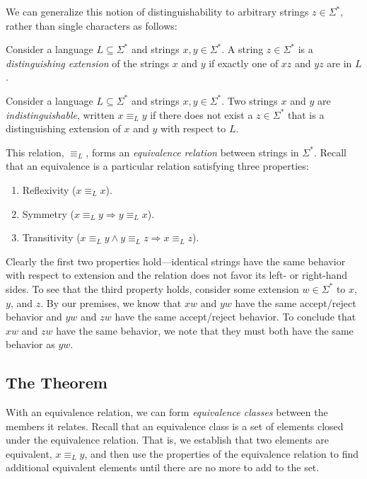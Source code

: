 \documentclass[11pt]{book}
\begin{document}
We can generalize this notion of distinguishability to arbitrary strings $z \in \Sigma^*$, rather than single characters as follows:
\begin{defn}
  Consider a language $L \subseteq \Sigma^*$ and strings $x, y \in \Sigma^*$.
  A string $z \in \Sigma^*$ is a \emph{distinguishing extension} of the strings $x$ and $y$ if exactly one of $xz$ and $yz$ are in $L$.
\end{defn}
\begin{defn}
  Consider a language $L \subseteq \Sigma^*$ and strings $x, y \in \Sigma^*$.
  Two strings $x$ and $y$ are \emph{indistinguishable}, written $x \equiv_L y$ if there does not exist a $z \in \Sigma^*$ that is a distinguishing extension of $x$ and $y$ with respect to $L$.
\end{defn}

This relation, $\equiv_L$, forms an \emph{equivalence relation} between strings in $\Sigma^*$.
Recall that an equivalence is a particular relation satisfying three properties:
\begin{enumerate}[itemsep=0pt]
  \item Reflexivity ($x \equiv_L x$).
  \item Symmetry ($x \equiv_L y \Rightarrow y \equiv_L x$).
  \item Transitivity ($x \equiv_L y \wedge y \equiv_L z \Rightarrow x \equiv_L z$).
\end{enumerate}
Clearly the first two properties hold---identical strings have the same behavior with respect to extension and the relation does not favor its left- or right-hand sides.
To see that the third property holds, consider some extension $w \in \Sigma^*$ to $x$, $y$, and $z$.
By our premises, we know that $xw$ and $yw$ have the same accept/reject behavior and $yw$ and $zw$ have the same accept/reject behavior.
To conclude that $xw$ and $zw$ have the same behavior, we note that they must both have the same behavior as $yw$.

\subsection*{The Theorem}

With an equivalence relation, we can form \emph{equivalence classes} between the members it relates.
Recall that an equivalence class is a set of elements closed under the equivalence relation.
That is, we establish that two elements are equivalent, $x \equiv_L y$, and then use the properties of the equivalence relation to find additional equivalent elements until there are no more to add to the set.
\end{document}
